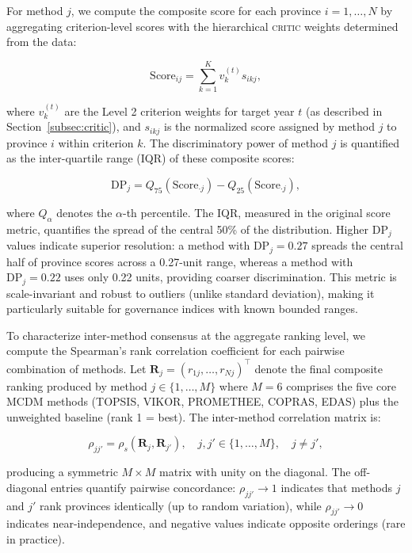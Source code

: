 \documentclass[12pt,a4paper]{article}
\newcommand{\CRITIC}{\textsc{critic}\xspace}
\begin{document}
For method $j$, we compute the composite score for each province $i = 1, \ldots, N$ by aggregating criterion-level scores with the hierarchical \CRITIC weights determined from the data:

\begin{equation}
\label{eq:composite_score}
\mathrm{Score}_{ij} = \sum_{k=1}^{K} v_k^{(t)} s_{ikj},
\end{equation}

where $v_k^{(t)}$ are the Level 2 criterion weights for target year $t$ (as described in Section~\ref{subsec:critic}), and $s_{ikj}$ is the normalized score assigned by method $j$ to province $i$ within criterion $k$. The discriminatory power of method $j$ is quantified as the inter-quartile range (IQR) of these composite scores:

\begin{equation}
\label{eq:discriminatory_power}
\mathrm{DP}_j = Q_{75}(\mathrm{Score}_{\cdot j}) - Q_{25}(\mathrm{Score}_{\cdot j}),
\end{equation}

where $Q_{\alpha}$ denotes the $\alpha$-th percentile. The IQR, measured in the original score metric, quantifies the spread of the central 50\% of the distribution. Higher $\mathrm{DP}_j$ values indicate superior resolution: a method with $\mathrm{DP}_j = 0.27$ spreads the central half of province scores across a 0.27-unit range, whereas a method with $\mathrm{DP}_j = 0.22$ uses only 0.22 units, providing coarser discrimination. This metric is scale-invariant and robust to outliers (unlike standard deviation), making it particularly suitable for governance indices with known bounded ranges.

To characterize inter-method consensus at the aggregate ranking level, we compute the Spearman's rank correlation coefficient for each pairwise combination of methods. Let $\mathbf{R}_j = (r_{1j}, \ldots, r_{Nj})^\top$ denote the final composite ranking produced by method $j \in \{1, \ldots, M\}$ where $M=6$ comprises the five core MCDM methods (TOPSIS, VIKOR, PROMETHEE, COPRAS, EDAS) plus the unweighted baseline (rank 1 = best). The inter-method correlation matrix is:

\begin{equation}
\label{eq:correlation_matrix}
\rho_{jj'} = \rho_s(\mathbf{R}_j, \mathbf{R}_{j'}), \quad j, j' \in \{1, \ldots, M\}, \quad j \neq j',
\end{equation}

producing a symmetric $M \times M$ matrix with unity on the diagonal. The off-diagonal entries quantify pairwise concordance: $\rho_{jj'} \to 1$ indicates that methods $j$ and $j'$ rank provinces identically (up to random variation), while $\rho_{jj'} \to 0$ indicates near-independence, and negative values indicate opposite orderings (rare in practice).
\end{document}
